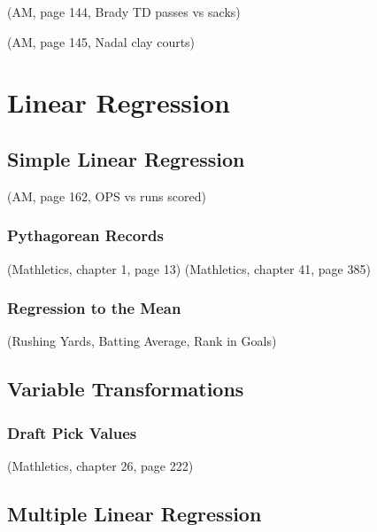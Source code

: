 \documentclass[
  11pt,
]{book}
\theoremstyle{definition}
\theoremstyle{definition}
\theoremstyle{definition}
\theoremstyle{definition}
\theoremstyle{remark}
\begin{document}
(AM, page 144, Brady TD passes vs sacks)

(AM, page 145, Nadal clay courts)

\hypertarget{linear-regression}{%
\chapter{Linear Regression}\label{linear-regression}}

\hypertarget{simple-linear-regression}{%
\section{Simple Linear Regression}\label{simple-linear-regression}}

(AM, page 162, OPS vs runs scored)

\hypertarget{pythagorean-records}{%
\subsection{Pythagorean Records}\label{pythagorean-records}}

(Mathletics, chapter 1, page 13)
(Mathletics, chapter 41, page 385)

\hypertarget{regression-to-the-mean}{%
\subsection{Regression to the Mean}\label{regression-to-the-mean}}

(Rushing Yards, Batting Average, Rank in Goals)

\hypertarget{variable-transformations}{%
\section{Variable Transformations}\label{variable-transformations}}

\hypertarget{draft-pick-values}{%
\subsection{Draft Pick Values}\label{draft-pick-values}}

(Mathletics, chapter 26, page 222)

\hypertarget{multiple-linear-regression}{%
\section{Multiple Linear Regression}\label{multiple-linear-regression}}
\end{document}
